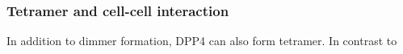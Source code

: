 \subsubsection{Tetramer and cell-cell interaction}

In addition to dimmer formation, DPP4 can also form tetramer. In contrast to 